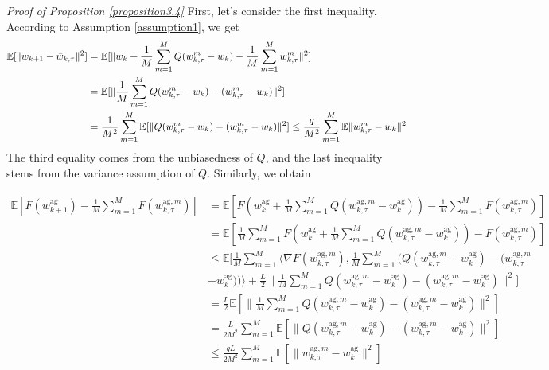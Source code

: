 \emph{Proof of Proposition \ref{proposition3.4}} \textrm{ } First, let's consider the first inequality. According to Assumption \ref{assumption1}, we get
\begin{align*}
    \mathbb{E}[\|w_{k+1} - \Bar{w}_{k, \tau}\|^2] &= \mathbb{E}[\|w_k + \frac{1}{M} \sum_{m=1}^M Q(w_{k, \tau}^m - w_k) - \frac{1}{M} \sum_{m=1}^M w_{k, \tau}^m\|^2] \\
    &= \mathbb{E}[\|\frac{1}{M} \sum_{m=1}^M Q(w_{k, \tau}^m - w_k) - (w_{k, \tau}^m - w_k)\|^2] \\
    &= \frac{1}{M^2} \sum_{m=1}^M \mathbb{E}[\|Q(w_{k, \tau}^m - w_k) - (w_{k, \tau}^m -w_k)\|^2] \leq \frac{q}{M^2} \sum_{m=1}^M \mathbb{E} \|w_{k, \tau}^m - w_k\|^2
\end{align*}
The third equality comes from the unbiasedness of $Q$, and the last inequality stems from the variance assumption of $Q$. Similarly, we obtain

\begin{align*}
    \mathbb{E}[F(w_{k+1}^{\textrm{ag}}) - \frac{1}{M} \sum_{m=1}^M F(w_{k, \tau}^{\textrm{ag}, m})] &= \mathbb{E}[F(w_k^{\textrm{ag}} + \frac{1}{M}\sum_{m=1}^M Q(w_{k, \tau}^{\textrm{ag}, m} - w_k^{\textrm{ag}})) - \frac{1}{M} \sum_{m=1}^M F(w_{k, \tau}^{\textrm{ag}, m})] \\
    &= \mathbb{E}[\frac{1}{M} \sum_{m=1}^M F(w_k^{\textrm{ag}} + \frac{1}{M}\sum_{m=1}^M Q(w_{k, \tau}^{\textrm{ag}, m} - w_k^{\textrm{ag}})) - F(w_{k, \tau}^{\textrm{ag}, m})] \\
    &\leq \mathbb{E}\Big[\frac{1}{M} \sum_{m=1}^M \langle \nabla F(w_{k, \tau}^{\textrm{ag}, m}), \frac{1}{M} \sum_{m=1}^M \Big( Q(w_{k, \tau}^{\textrm{ag}, m} - w_k^{\textrm{ag}}) - (w_{k, \tau}^{\textrm{ag}, m} \\
    &- w_k^{\textrm{ag}})\Big) \rangle + \frac{L}{2} \|\frac{1}{M} \sum_{m=1}^M  Q(w_{k, \tau}^{\textrm{ag}, m} - w_k^{\textrm{ag}}) - (w_{k, \tau}^{\textrm{ag}, m} - w_k^{\textrm{ag}})\|^2\Big] \\
    &= \frac{L}{2} \mathbb{E}[\|\frac{1}{M} \sum_{m=1}^M  Q(w_{k, \tau}^{\textrm{ag}, m} - w_k^{\textrm{ag}}) - (w_{k, \tau}^{\textrm{ag}, m} - w_k^{\textrm{ag}})\|^2] \\
    &= \frac{L}{2M^2}\sum_{m=1}^M \mathbb{E}[\| Q(w_{k, \tau}^{\textrm{ag}, m} - w_k^{\textrm{ag}}) - (w_{k, \tau}^{\textrm{ag}, m} - w_k^{\textrm{ag}})\|^2] \\
    &\leq \frac{qL}{2M^2} \sum_{m=1}^M \mathbb{E}[\|w_{k, \tau}^{\textrm{ag}, m} - w_k^{\textrm{ag}}\|^2]
\end{align*}

